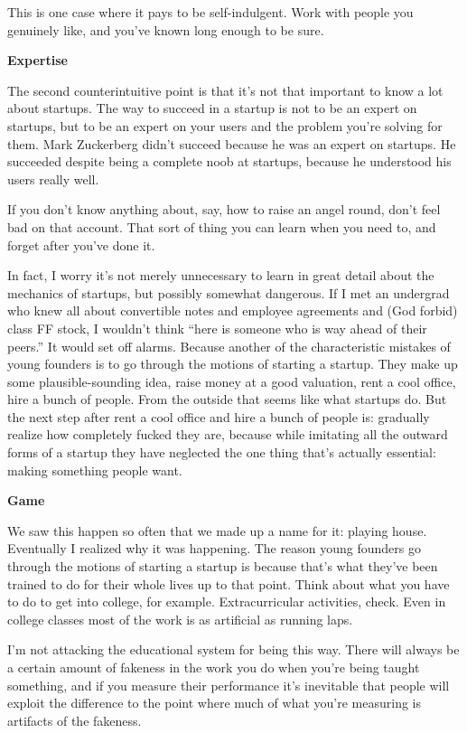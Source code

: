 \documentclass[12pt]{book}
\begin{document}
This is one case where it pays to be self-indulgent. Work with people
you genuinely like, and you've known long enough to be sure.

\textbf{Expertise}

The second counterintuitive point is that it's not that important to
know a lot about startups. The way to succeed in a startup is not to be
an expert on startups, but to be an expert on your users and the problem
you're solving for them. Mark Zuckerberg didn't succeed because he was
an expert on startups. He succeeded despite being a complete noob at
startups, because he understood his users really well.

If you don't know anything about, say, how to raise an angel round,
don't feel bad on that account. That sort of thing you can learn when
you need to, and forget after you've done it.

In fact, I worry it's not merely unnecessary to learn in great detail
about the mechanics of startups, but possibly somewhat dangerous. If I
met an undergrad who knew all about convertible notes and employee
agreements and (God forbid) class FF stock, I wouldn't think ``here is
someone who is way ahead of their peers.'' It would set off alarms.
Because another of the characteristic mistakes of young founders is to
go through the motions of starting a startup. They make up some
plausible-sounding idea, raise money at a good valuation, rent a cool
office, hire a bunch of people. From the outside that seems like what
startups do. But the next step after rent a cool office and hire a bunch
of people is: gradually realize how completely fucked they are, because
while imitating all the outward forms of a startup they have neglected
the one thing that's actually essential: making something people want.

\textbf{Game}

We saw this happen so often that we made up a name for it: playing
house. Eventually I realized why it was happening. The reason young
founders go through the motions of starting a startup is because that's
what they've been trained to do for their whole lives up to that point.
Think about what you have to do to get into college, for example.
Extracurricular activities, check. Even in college classes most of the
work is as artificial as running laps.

I'm not attacking the educational system for being this way. There will
always be a certain amount of fakeness in the work you do when you're
being taught something, and if you measure their performance it's
inevitable that people will exploit the difference to the point where
much of what you're measuring is artifacts of the fakeness.
\end{document}
